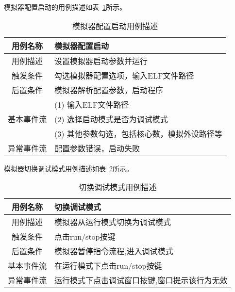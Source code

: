 模拟器配置启动的用例描述如表~\ref{tab:yongli1}所示。
\begin{table}[H]
  \centering
  \caption{模拟器配置启动用例描述}
  \label{tab:yongli1}
  \renewcommand\arraystretch{1.1}
  \begin{tabular}{cl}
    \toprule
用例名称 &	模拟器配置启动\\
    \midrule
用例描述 &	\multicolumn{1}{p{9cm}}{设置模拟器启动参数并运行}\\ \hline
触发条件 &	\multicolumn{1}{p{9cm}}{勾选模拟器配置选项，输入ELF文件路径}\\ \hline
后置条件 &	\multicolumn{1}{p{9cm}}{模拟器解析配置参数，启动程序}\\ \hline
	& \multicolumn{1}{p{9cm}}{(1)	输入ELF文件路径} \\
  基本事件流 & \multicolumn{1}{p{9cm}}{(2)	选择启动模式是否为调试模式} \\
 & \multicolumn{1}{p{9cm}}{(3)	其他参数勾选，包括核心数，模拟外设路径等}\\ \hline
异常事件流	& \multicolumn{1}{p{9cm}}{配置参数错误，启动失败}\\
    \bottomrule
  \end{tabular}
\end{table}


模拟器切换调试模式用例描述如表~\ref{tab:yongli2}所示。
\begin{table}[H]
  \centering
  \caption{切换调试模式用例描述}
  \label{tab:yongli2}
  \renewcommand\arraystretch{1.1}
  \begin{tabular}{cl}
    \toprule
用例名称	& 切换调试模式\\
    \midrule
用例描述	& \multicolumn{1}{p{9cm}}{模拟器从运行模式切换为调试模式}\\ \hline
触发条件	& \multicolumn{1}{p{9cm}}{点击run/stop按键}\\ \hline
后置条件	& \multicolumn{1}{p{9cm}}{模拟器暂停指令流程,进入调试模式}\\ \hline
基本事件流	& \multicolumn{1}{p{9cm}}{在运行模式下点击run/stop按键}\\ \hline
异常事件流	& \multicolumn{1}{p{9cm}}{运行模式下点击调试窗口按键,窗口提示该行为无效}\\
    \bottomrule
  \end{tabular}
\end{table}


